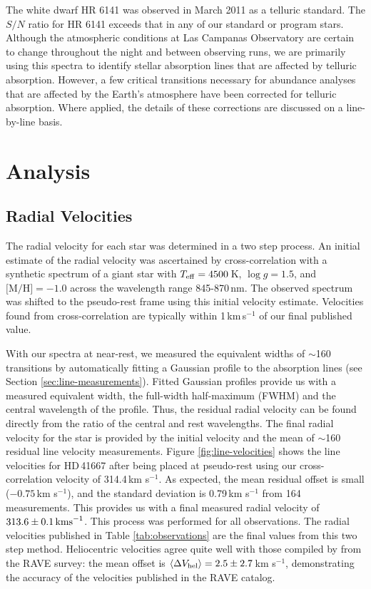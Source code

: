 \documentclass{emulateapj}
\begin{document}
The white dwarf HR 6141 was observed in March 2011 as a telluric standard. The $S/N$ ratio for HR 6141 exceeds that in any of our standard or program stars. Although the atmospheric conditions at Las Campanas Observatory are certain to change throughout the night and between observing runs, we are primarily using this spectra to identify stellar absorption lines that are affected by telluric absorption. However, a few critical transitions necessary for abundance analyses that are affected by the Earth's atmosphere have been corrected for telluric absorption. Where applied, the details of these corrections are discussed on a line-by-line basis.

\section{Analysis}
\label{sec:analysis}

\subsection{Radial Velocities}
\label{sec:radial-velocities}

The radial velocity for each star was determined in a two step process. An initial estimate of the radial velocity was ascertained by cross-correlation with a synthetic spectrum of a giant star with $T_{\rm eff} = 4500$\,K, $\log{g} = 1.5$, and ${\mbox{[M/H]} = -1.0}$ across the wavelength range {845-870\,nm}. The observed spectrum was shifted to the pseudo-rest frame using this initial velocity estimate. Velocities found from cross-correlation are typically within {1\,km\,s$^{-1}$} of our final published value.

With our spectra at near-rest, we measured the equivalent widths of $\sim$160 transitions by automatically fitting a Gaussian profile to the absorption lines (see Section \ref{sec:line-measurements}). Fitted Gaussian profiles provide us with a measured equivalent width, the full-width half-maximum (FWHM) and the central wavelength of the profile. Thus, the residual radial velocity can be found directly from the ratio of the central and rest wavelengths. The final radial velocity for the star is provided by the initial velocity and the mean of $\sim$160 residual line velocity measurements. Figure \ref{fig:line-velocities} shows the line velocities for HD\,41667 after being placed at pseudo-rest using our cross-correlation velocity of 314.4\,km s$^{-1}$. As expected, the mean residual offset is small ($-0.75$\,km s$^{-1}$), and the standard deviation is 0.79\,km s$^{-1}$ from 164 measurements. This provides us with a final measured radial velocity of ${313.6 \pm 0.1\,{\rm km s}^{-1}}$. This process was performed for all observations. The radial velocities published in Table \ref{tab:observations} are the final values from this two step method. Heliocentric velocities agree quite well with those compiled by \citet{williams;et-al_2011} from the RAVE survey: the mean offset is ${\langle\Delta{V_{\rm hel}}\rangle = 2.5 \pm 2.7}$\,km s$^{-1}$, demonstrating the accuracy of the velocities published in the RAVE catalog.
\end{document}
